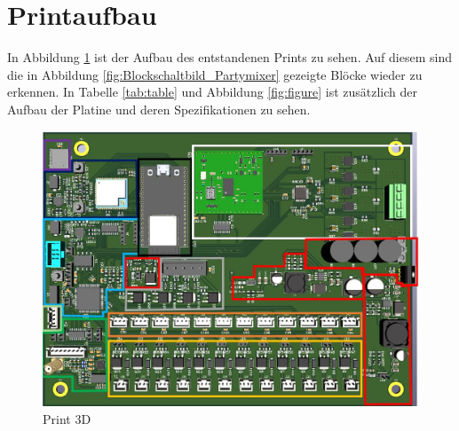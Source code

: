 \newpage
\section{Printaufbau}
\label{sec:Printaufbau}

In Abbildung \ref{fig:Print_3D} ist der Aufbau des entstandenen Prints zu sehen. Auf diesem sind die in Abbildung  \ref{fig:Blockschaltbild_Partymixer} gezeigte Blöcke wieder zu erkennen. In Tabelle \ref{tab:table} und Abbildung \ref{fig:figure} ist zusätzlich der Aufbau der Platine und deren Spezifikationen zu sehen.

\begin{figure}[H]
	\centering
	\includegraphics[width=\textwidth]{graphics/Printteile}
	\caption{Print 3D}
	\label{fig:Print_3D}
\end{figure} 

